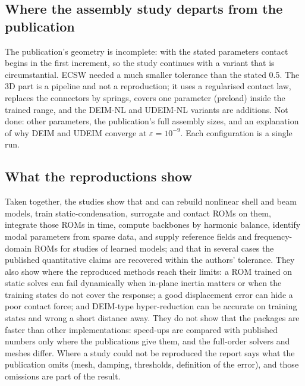 \subsection*{Where the assembly study departs from the publication}

The publication's geometry is incomplete: with the stated parameters contact begins in the first increment, so the study continues with a variant that is circumstantial. ECSW needed a much smaller tolerance than the stated 0.5. The 3D part is a pipeline and not a reproduction; it uses a regularised contact law, replaces the connectors by springs, covers one parameter (preload) inside the trained range, and the DEIM-NL and UDEIM-NL variants are additions. Not done: other parameters, the publication's full assembly sizes, and an explanation of why DEIM and UDEIM converge at $\varepsilon=10^{-9}$. Each configuration is a single run.

\subsection*{What the reproductions show}\label{sec:vf-repro-summary}

Taken together, the studies show that \fea{} and \rom{} can rebuild nonlinear shell and beam models, train static-condensation, surrogate and contact ROMs on them, integrate those ROMs in time, compute backbones by harmonic balance, identify modal parameters from sparse data, and supply reference fields and frequency-domain ROMs for studies of learned models; and that in several cases the published quantitative claims are recovered within the authors' tolerance. They also show where the reproduced methods reach their limits: a ROM trained on static solves can fail dynamically when in-plane inertia matters or when the training states do not cover the response; a good displacement error can hide a poor contact force; and DEIM-type hyper-reduction can be accurate on training states and wrong a short distance away. They do not show that the packages are faster than other implementations: speed-ups are compared with published numbers only where the publications give them, and the full-order solvers and meshes differ. Where a study could not be reproduced the report says what the publication omits (mesh, damping, thresholds, definition of the error), and those omissions are part of the result.
